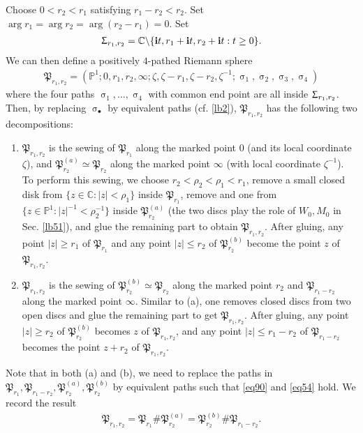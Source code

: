 \documentclass[12pt,a4paper,notitlepage]{article}
\theoremstyle{definition}
\theoremstyle{plain}
\newcommand{\fk}{\mathfrak}
\newcommand{\im}{\mathbf{i}}
\newcommand{\blt}{\bullet}
\newcommand{\Cbb}{\mathbb C}
\newcommand{\Pbb}{\mathbb P}
\numberwithin{equation}{subsection}
\begin{document}
Choose $0<r_2<r_1$ satisfying $r_1-r_2<r_2$. Set $\arg r_1=\arg r_2=\arg(r_2-r_1)=0$. Set
\begin{align*}
\Upsigma_{r_1,r_2}=\Cbb\backslash\{\im t,r_1+\im t,r_2+\im t:t\geq 0\}.	
\end{align*}
We can then define a positively $4$-pathed Riemann sphere
\begin{align*}
\fk P_{r_1,r_2}=(\Pbb^1;0,r_1,r_2,\infty;\zeta,\zeta-r_1,\zeta-r_2,\zeta^{-1};\upsigma_1,\upsigma_2,\upsigma_3,\upsigma_4)	
\end{align*}
where the four paths $\upsigma_1,\dots,\upsigma_4$ with common end point are all inside $\Upsigma_{r_1,r_2}$. Then, by replacing $\upsigma_\blt$ by equivalent paths (cf. \ref{lb2}), $\fk P_{r_1,r_2}$ has the following two decompositions:
\begin{enumerate}[label=(\alph*)]
\item $\fk P_{r_1,r_2}$ is the sewing of  $\fk P_{r_1}$ along the marked point $0$ (and its local coordinate $\zeta$), and $\fk P_{r_2}^{(a)}\simeq\fk P_{r_2}$ along the marked point $\infty$ (with local coordinate $\zeta^{-1}$). To perform this sewing, we choose $r_2<\rho_2<\rho_1<r_1$, remove a small closed disk from $\{z\in\Cbb:|z|<\rho_1\}$ inside $\fk P_{r_1}$, remove and one from $\{z\in\Pbb^1:|z|^{-1}<\rho_2^{-1}\}$ inside $\fk P_{r_2}^{(a)}$ (the two discs play the role of $W_0,M_0$ in Sec. \ref{lb51}), and glue the remaining part to obtain $\fk P_{r_1,r_2}$. After gluing, any point $|z|\geq r_1$ of $\fk P_{r_1}$ and any point $|z|\leq r_2$ of $\fk P_{r_2}^{(b)}$ become the point $z$ of $\fk P_{r_1,r_2}$.

\item $\fk P_{r_1,r_2}$ is the sewing of  $\fk P_{r_2}^{(b)}\simeq\fk P_{r_2}$ along the marked point $r_2$ and $\fk P_{r_1-r_2}$ along the marked point $\infty$. Similar to (a), one removes closed discs from two open discs and glue the remaining part to get $\fk P_{r_1,r_2}$. After gluing, any point $|z|\geq r_2$ of $\fk P^{(b)}_{r_2}$ becomes $z$ of $\fk P_{r_1,r_2}$, and any point $|z|\leq r_1-r_2$ of $\fk P_{r_1-r_2}$ becomes the point $z+r_2$ of $\fk P_{r_1,r_2}$.
\end{enumerate}

Note that in both (a) and (b), we need to replace the paths in $\fk P_{r_1},\fk P_{r_1-r_2},\fk P_{r_2}^{(a)},\fk P_{r_2}^{(b)}$ by equivalent paths such that \eqref{eq90} and \eqref{eq54} hold. We record the result
\begin{align}
\fk P_{r_1,r_2}=\fk P_{r_1}\# \fk P_{r_2}^{(a)}=\fk P_{r_2}^{(b)}\#\fk P_{r_1-r_2}.	\label{eq97}
\end{align}
\end{document}

